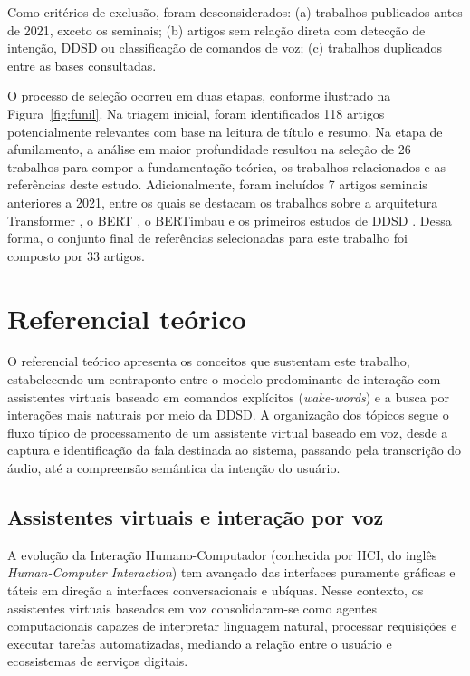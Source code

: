 \documentclass[
    12pt,                %
    openright,           %
    oneside,             %
    a4paper,             %
    english,             %
    brazil               %
]{abntex2}
\begin{document}
Como critérios de exclusão, foram desconsiderados: (a) trabalhos publicados antes de 2021, exceto os seminais; (b) artigos sem relação direta com detecção de intenção, DDSD ou classificação de comandos de voz; (c) trabalhos duplicados entre as bases consultadas.

O processo de seleção ocorreu em duas etapas, conforme ilustrado na Figura~\ref{fig:funil}. Na triagem inicial, foram identificados 118 artigos potencialmente relevantes com base na leitura de título e resumo. Na etapa de afunilamento, a análise em maior profundidade resultou na seleção de 26 trabalhos para compor a fundamentação teórica, os trabalhos relacionados e as referências deste estudo. Adicionalmente, foram incluídos 7 artigos seminais anteriores a 2021, entre os quais se destacam os trabalhos sobre a arquitetura Transformer \cite{Vaswani2017}, o BERT \cite{Devlin2019}, o BERTimbau \cite{Souza2020} e os primeiros estudos de DDSD \cite{Mallidi2018, Norouzian2019}. Dessa forma, o conjunto final de referências selecionadas para este trabalho foi composto por 33 artigos.

\section{Referencial teórico}
\label{sec:referencial}

O referencial teórico apresenta os conceitos que sustentam este trabalho, estabelecendo um contraponto entre o modelo predominante de interação com assistentes virtuais baseado em comandos explícitos (\textit{wake-words}) e a busca por interações mais naturais por meio da DDSD. A organização dos tópicos segue o fluxo típico de processamento de um assistente virtual baseado em voz, desde a captura e identificação da fala destinada ao sistema, passando pela transcrição do áudio, até a compreensão semântica da intenção do usuário.


\subsection{Assistentes virtuais e interação por voz}

A evolução da Interação Humano-Computador (conhecida por HCI, do inglês \textit{Human-Computer Interaction}) tem avançado das interfaces puramente gráficas e táteis em direção a interfaces conversacionais e ubíquas. Nesse contexto, os assistentes virtuais baseados em voz consolidaram-se como agentes computacionais capazes de interpretar linguagem natural, processar requisições e executar tarefas automatizadas, mediando a relação entre o usuário e ecossistemas de serviços digitais.
\end{document}
